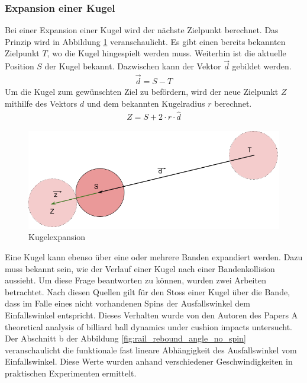 \subsubsection{Expansion einer Kugel}
Bei einer Expansion einer Kugel wird der nächste Zielpunkt berechnet. Das Prinzip wird in Abbildung \ref{fig:kugelexpansion}
veranschaulicht. Es gibt einen bereits bekannten Zielpunkt $T$, wo die Kugel hingespielt werden muss.
Weiterhin ist die aktuelle Position $S$ der Kugel bekannt. Dazwischen kann der Vektor $\vec{d}$ gebildet werden.
\begin{align}
    \vec{d} = S - T
\end{align}
Um die Kugel zum gewünschten Ziel zu befördern, wird der neue Zielpunkt $Z$ mithilfe des Vektors $d$ und dem bekannten
Kugelradius $r$ berechnet.
\begin{align}
    Z = S + 2 \cdot r \cdot \hat{d}
\end{align}

\begin{figure}[h!]
    \begin{center}
        \includegraphics[width=0.5\linewidth]{../common/03_billiard_ai/resources/35_suchkandidat_kugel_expand.png}
    \end{center}
    \caption{Kugelexpansion}
    \label{fig:kugelexpansion}
\end{figure}

\label{kandidatensuche:bandenkollisionstheorie}
Eine Kugel kann ebenso über eine oder mehrere Banden expandiert werden. Dazu muss bekannt sein, wie der Verlauf einer
Kugel nach einer Bandenkollision aussieht. Um diese Frage beantworten zu können, wurden zwei Arbeiten betrachtet.
Nach diesen Quellen gilt für den Stoss einer Kugel über die Bande, dass im Falle eines nicht vorhandenen Spins
der Ausfallswinkel dem Einfallswinkel entspricht. Dieses Verhalten wurde von den Autoren des Papers \glqq A theoretical analysis of billiard ball dynamics under cushion impacts\grqq{}
untersucht\cite{10.1243/09544062JMES1964}. Der Abschnitt \glqq b\grqq{} der Abbildung \ref{fig:rail_rebound_angle_no_spin} veranschaulicht die
funktionale fast lineare Abhängigkeit des Ausfallswinkel vom Einfallswinkel. Diese Werte wurden anhand verschiedener
Geschwindigkeiten in praktischen Experimenten ermittelt\cite{10.1243/09544062JMES1964}.

